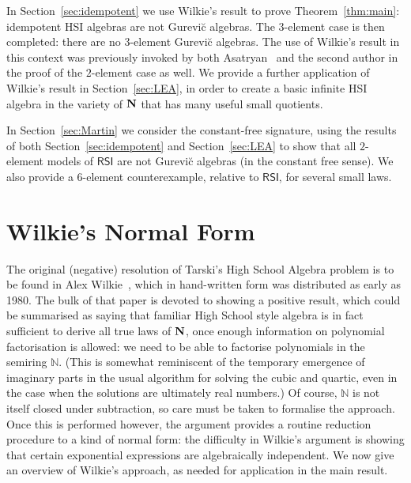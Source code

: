 \documentclass[eqnor,reqno]{amsart}
\theoremstyle{plain}
\theoremstyle{definition}
\newcommand{\RSI}{\textsf{RSI}}
\begin{document}
In Section~\ref{sec:idempotent} we use Wilkie's result to prove Theorem~\ref{thm:main}: idempotent HSI algebras are not Gurevi\u{c} algebras. 
The $3$-element case is then completed: there are no 3-element Gurevi\u{c} algebras.
The use of Wilkie's result in this context was previously invoked by both Asatryan~\cite{asa,asa2} and the second author in the proof of the $2$-element case as well.
We provide a further application of Wilkie's result in Section~\ref{sec:LEA}, in order to create a basic infinite HSI algebra in the variety of ${\bf N}$ that has many useful small quotients.

In Section~\ref{sec:Martin} we consider the constant-free signature, using the results of both Section~\ref{sec:idempotent} and Section~\ref{sec:LEA} to show that all $2$-element models of $\RSI$ are not Gurevi\u{c} algebras (in the constant free sense).  We also provide a $6$-element counterexample, relative to $\RSI$, for several small laws.



\section{Wilkie's Normal Form}\label{sec:Wilkie}
The original (negative) resolution of Tarski's High School Algebra problem is to be found in Alex Wilkie~\cite{wil00}, which in hand-written form was distributed as early as 1980.  
The bulk of that paper is devoted to showing a positive result, which could be summarised as saying that familiar High School style algebra is in fact sufficient to derive all true laws of ${\bf N}$, once enough information on polynomial factorisation is allowed: we need to be able to factorise polynomials in the semiring $\mathbb{N}$.  
(This is somewhat reminiscent of the temporary emergence of imaginary parts in the usual algorithm for solving the cubic and quartic, even in the case when the solutions are ultimately real numbers.)
Of course, $\mathbb{N}$ is not itself closed under subtraction, so care must be taken to formalise the approach.  
Once this is performed however, the argument provides a routine reduction procedure to a kind of normal form: the difficulty in Wilkie's argument is showing that certain exponential expressions are algebraically independent.
We now give an overview of Wilkie's approach, as needed for application in the main result. 
\end{document}
